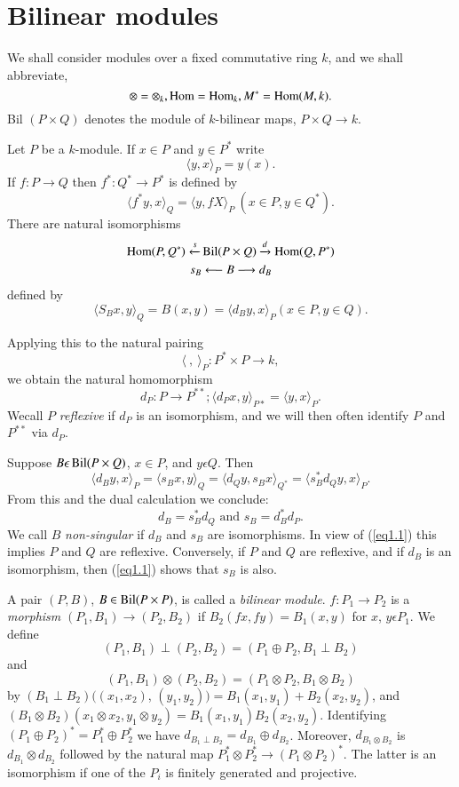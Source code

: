 \section{Bilinear modules}\label{chap5:sec1}%

We shall consider modules over a fixed commutative ring $k$, and we
shall abbreviate,  
$$
\otimes = \otimes _k, \operatorname{Hom} = \operatorname{Hom} _k, M^* = \operatorname{Hom} (M, k). 
$$ 
Bil $(P \times Q)$ denotes the module of $k$-bilinear maps, $P \times
Q \to k$.  

Let $P$ be a $k$-module. If $x \in P$ and $y \in P^*$ write
$$
\langle y, x \rangle_P =  y (x). 
$$ 
If $f : P \to Q$ then $f^\ast : Q^\ast \to P^\ast$ is defined by  
$$
\langle f^\ast y, x \rangle_Q = \langle y, f X \rangle_P ~ (x \in P, y
\in Q^\ast). 
$$
There are natural isomorphisms
\begin{gather*}
\operatorname{Hom} (P, Q^*) \xleftarrow{s} \operatorname{Bil}(P \times Q) \xrightarrow{d} \operatorname{Hom} (Q,
P^\ast)\\ 
s_B \longleftarrow B \longrightarrow d_B
\end{gather*}
defined by
$$
\langle S_B x, y \rangle_Q = B (x, y) = \langle d_B y, x \rangle_P (x 
\in P, y \in Q). 
$$
 
Applying this to the natural pairing 
$$
\langle~ , ~ \rangle_P : P^* \times P \to k,  
$$
we obtain the natural homomorphism 
$$
d_P : P \to P^{\ast \ast} ; \langle d_P x,  y \rangle _{P*} = \langle y , x
\rangle_P. 
$$
We\pageoriginale call $P$ \textit{reflexive} if $d_P$ is an
isomorphism, and we will then often identify $P$ and $P^{**}$ via
$d_P$.  

Suppose $B \epsilon \operatorname{Bil}(P \times Q)$, $x \in P$, and $y \epsilon Q$. Then
$$
\langle d_B y, x \rangle_P = \langle s_B x, y \rangle_Q = \langle d_Q
y, s_B x \rangle _{Q^\ast}= \langle s^\ast_B d_Q y, x \rangle_P. 
$$ 
From this and the dual calculation we conclude:
\begin{equation*}
d_B = s^\ast_B d_Q \text{ and } s_B = d^\ast_B d_P. \tag{1.1}\label{eq1.1}
\end{equation*}
We call $B$ \textit{non-singular} if $d_B$ and $s_B$ are
isomorphisms. In view of (\ref{eq1.1}) this implies $P$ and $Q$ are
reflexive. Conversely, if $P$ and $Q$ are reflexive, and if $d_B$ is
an isomorphism, then (\ref{eq1.1}) shows that $s_B$ is also. 

A pair $(P, B)$, $B \in \operatorname{Bil}(P \times P)$, is called a
\textit{bilinear module}. $f : P_1 \to P_2$ is a \textit{morphism}
$(P_1, B_1) \to (P_2, B_2)$ if $B_2(fx, fy) = B_1(x, y)$ for $x$, $y
\epsilon P_1$. We define 
$$
(P_1, B_1) \perp (P_2, B_2) = (P_1 \oplus P_2, B_1 \perp B_2) 
$$
and 
$$
(P_1, B_1) \otimes (P_2, B_2) = (P_1 \otimes P_2, B_1 \otimes B_2) 
$$
by $(B_1 \perp B_2)((x_1, x_2)$, $(y_1, y_2))= B_1(x_1, y_1)+B_2 (x_2,
y_2)$, and $(B_1 \otimes B_2)(x_1 \otimes x_2, y_1 \otimes y_2)=B_1
(x_1, y_1) B_2(x_2, y_2)$. Identifying $(P_1 \oplus P_2)^* = P^*_1
\oplus P^*_2$ we have $d_{B_1 \perp B_2} = d_{B_1} \oplus
d_{B_2}$. Moreover, $d_{B_1 \otimes B_2}$ is $d_{B_1} \otimes d_{B_2}$
followed by the natural map $P^*_1 \otimes P^*_2 \to (P_1 \otimes
P_2)^*$. The latter is an isomorphism if one of the $P_i$ is finitely
generated and projective. 

